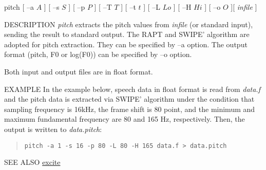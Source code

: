 \begin{synopsis}
 \item[pitch] [ --a $A$ ] [ --s $S$ ] [ --p $P$ ] [ --T $T$ ] [ --t $t$ ]
 [ --L $Lo$ ] [ --H $Hi$ ] [ --o $O$ ][ {\em infile} ]
\end{synopsis}

\begin{qsection}{DESCRIPTION}
{\em pitch} extracts the pitch values from {\em infile} (or standard input),
sending the result to standard output.
The RAPT \cite{ref:pitch-RAPT} and SWIPE' \cite{ref:pitch-SWIPE}
 algorithm are adopted for pitch extraction.
They can be specified by --a option.
The output format (pitch, F0 or log(F0)) can be specified by --o option.

Both input and output files are in float format.

\end{qsection}

\begin{options}
\end{options}

\begin{qsection}{EXAMPLE}
 In the example below, speech data in float format
 is read from {\em data.f} and the pitch data is extracted via SWIPE' algorithm
 under the condition that sampling frequency is 16kHz,
 the frame shift is 80 point,
 and the minimum and maximum fundamental frequency are
 80 and 165 Hz, respectively.
 Then, the output is written to {\em data.pitch}:
 \begin{quote}
  \verb!pitch -a 1 -s 16 -p 80 -L 80 -H 165 data.f > data.pitch!
 \end{quote}
\end{qsection}

\begin{qsection}{SEE ALSO}
\hyperlink{excite}{excite}
\end{qsection}
